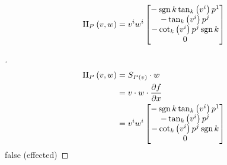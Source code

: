 \documentclass[stu, babel, american, biblatex, a4paper, draftall]{apa7}
\begin{document}
\begin{lemma}\label{Model:SecondFundamental}
    \begin{equation*}
        \text{II}_{\tensor{P}{}}\left(v,w\right) = \tensor{v}{^i}\tensor{w}{^i} \begin{bmatrix}
            -\sign{k}\tan_k\left(\tensor{v}{^i}\right)\tensor{p}{^1}       \\
            -\tan_k\left(\tensor{v}{^i}\right)\tensor{p}{^j} \\
            -\cot_k\left(\tensor{v}{^i}\right)\tensor{p}{^j}\sign{k}\\
            0 \\
        \end{bmatrix}
    \end{equation*}
\end{lemma}
\begin{proof}[]
    \skipped

    \begin{align*}
        \text{II}_{\tensor{P}{}}\left(v,w\right)
        &= S_{\tensor{P}{}\left(v\right)} \cdot w \\
        &= v \cdot w \cdot \frac{\partial f}{\partial x} \\
        &= \tensor{v}{^i}\tensor{w}{^i} \begin{bmatrix}
            -\sign{k}\tan_k\left(\tensor{v}{^i}\right)\tensor{p}{^1}       \\
            -\tan_k\left(\tensor{v}{^i}\right)\tensor{p}{^j} \\
            -\cot_k\left(\tensor{v}{^i}\right)\tensor{p}{^j}\sign{k}\\
            0 \\
        \end{bmatrix}
    \end{align*}
    false (effected)
\end{proof}
\begin{lemma}\label{Model:PrincipalCurvature}

\end{lemma}
\end{document}
